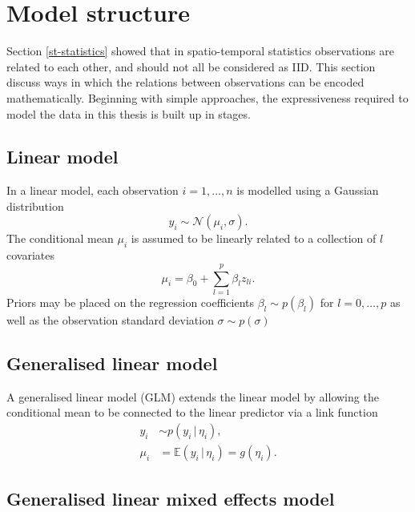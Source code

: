 \documentclass[a4paper, nobind]{templates/ociamthesis}
\begin{document}
\hypertarget{model-structure}{%
\section{Model structure}\label{model-structure}}

Section \ref{st-statistics} showed that in spatio-temporal statistics observations are related to each other, and should not all be considered as IID.
This section discuss ways in which the relations between observations can be encoded mathematically.
Beginning with simple approaches, the expressiveness required to model the data in this thesis is built up in stages.

\hypertarget{linear-model}{%
\subsection{Linear model}\label{linear-model}}

In a linear model, each observation \(i = 1, \ldots, n\) is modelled using a Gaussian distribution
\begin{equation}
y_i \sim \mathcal{N}(\mu_i, \sigma).
\end{equation}
The conditional mean \(\mu_i\) is assumed to be linearly related to a collection of \(l\) covariates
\begin{equation}
\mu_i = \beta_0 + \sum_{l = 1}^{p} \beta_l z_{li}.
\end{equation}
Priors may be placed on the regression coefficients \(\beta_l \sim p(\beta_l)\) for \(l = 0, \ldots, p\) as well as the observation standard deviation \(\sigma \sim p(\sigma)\)

\hypertarget{generalised-linear-model}{%
\subsection{Generalised linear model}\label{generalised-linear-model}}

A generalised linear model (GLM) extends the linear model by allowing the conditional mean to be connected to the linear predictor via a link function
\begin{align}
y_i &\sim p(y_i \, | \, \eta_i), \\
\mu_i &= \mathbb{E}(y_i \, | \, \eta_i) = g(\eta_i).
\end{align}

\hypertarget{generalised-linear-mixed-effects-model}{%
\subsection{Generalised linear mixed effects model}\label{generalised-linear-mixed-effects-model}}
\end{document}
